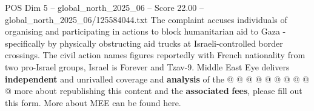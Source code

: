 \begin{textsample}{POS Dim 5 – global\_north\_2025\_06 – Score 22.00 – global\_north\_2025\_06/125584044.txt}
The complaint accuses individuals of organising and participating in actions to block humanitarian aid to Gaza - specifically by physically obstructing aid trucks at Israeli-controlled border crossings.
The civil action names figures reportedly with French nationality from two pro-Israel groups, Israel is Forever and Tzav-9.
Middle East Eye delivers \textbf{independent} and unrivalled coverage and \textbf{analysis} of the @ @ @ @ @ @ @ @ @ @ more about republishing this content and the \textbf{associated} \textbf{fees}, please fill out this form.
More about MEE can be found here.

\end{textsample}
